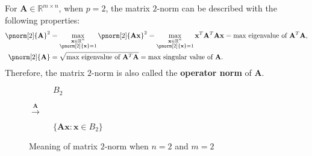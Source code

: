 \documentclass{huhtakm-template-book-v2}
\begin{document}
    \begin{eg}
        \label{Chapter 2 (Example) Matrix 2-norm}
        For $\mathbf{A} \in \mathbb{R}^{m \times n}$, when $p = 2$, the matrix $2$-norm can be described with the following properties:
        \begin{align*}
            \pnorm[2]{\mathbf{A}}^{2} &= \max_{\substack{\mathbf{x} \in \mathbb{R}^{n}\\\pnorm[2]{\mathbf{x}} = 1}}\pnorm[2]{\mathbf{Ax}}^{2} = \max_{\substack{\mathbf{x} \in \mathbb{R}^{n}\\\pnorm[2]{\mathbf{x}} = 1}}\mathbf{x}^{T}\mathbf{A}^{T}\mathbf{Ax} = \text{max eigenvalue of } \mathbf{A}^{T}\mathbf{A},\\
            \pnorm[2]{\mathbf{A}} &= \sqrt{\text{max eigenvalue of } \mathbf{A}^{T}\mathbf{A}} = \text{max singular value of } \mathbf{A}.
        \end{align*}
        Therefore, the matrix $2$-norm is also called the \textbf{operator norm} of $\mathbf{A}$.
    \end{eg}
    \begin{figure}[h]
        \centering
        \begin{subfigure}[h]{0.3\textwidth}
            \centering
            
            $B_{2}$
        \end{subfigure}
        $\xrightarrow{\mathbf{A}}$
        \begin{subfigure}[h]{0.3\textwidth}
            \centering
            
            $\{\mathbf{Ax} : \mathbf{x} \in B_{2}\}$
        \end{subfigure}
        \caption{Meaning of matrix $2$-norm when $n = 2$ and $m = 2$}
    \end{figure}
    \newpage
\end{document}
